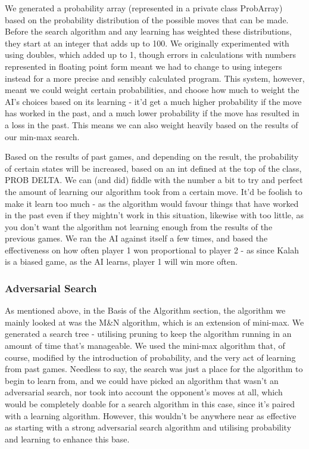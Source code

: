\documentclass[11pt]{article}
\begin{document}
We generated a probability array (represented in a private class ProbArray) based on the probability distribution of the possible moves that can be made. Before the search algorithm and any learning has weighted these distributions, they start at an integer that adds up to 100. We originally experimented with using doubles, which added up to 1, though errors in calculations with numbers represented in floating point form meant we had to change to using integers instead for a more precise and sensibly calculated program. This system, however, meant we could weight certain probabilities, and choose how much to weight the AI's choices based on its learning - it'd get a much higher probability if the move has worked in the past, and a much lower probability if the move has resulted in a loss in the past. This means we can also weight heavily based on the results of our min-max search.

Based on the results of past games, and depending on the result, the probability of certain states will be increased, based on an int defined at the top of the class, PROB DELTA. We can (and did) fiddle with the number a bit to try and perfect the amount of learning our algorithm took from a certain move. It'd be foolish to make it learn too much - as the algorithm would favour things that have worked in the past even if they mightn't work in this situation, likewise with too little, as you don't want the algorithm not learning enough from the results of the previous games. We ran the AI against itself a few times, and based the effectiveness on how often player 1 won proportional to player 2 - as since Kalah is a biased game, as the AI learns, player 1 will win more often.
\subsubsection{Adversarial Search}
\label{sec-3-2-2}

As mentioned above, in the Basis of the Algorithm section, the algorithm we mainly looked at was the M\&N algorithm, which is an extension of mini-max. We generated a search tree - utilising pruning to keep the algorithm running in an amount of time that's manageable. We used the mini-max algorithm that, of course, modified by the introduction of probability, and the very act of learning from past games. Needless to say, the search was just a place for the algorithm to begin to learn from, and we could have picked an algorithm that wasn't an adversarial search, nor took into account the opponent's moves at all, which would be completely doable for a search algorithm in this case, since it's paired with a learning algorithm. However, this wouldn't be anywhere near as effective as starting with a strong adversarial search algorithm and utilising probability and learning to enhance this base.
\end{document}
